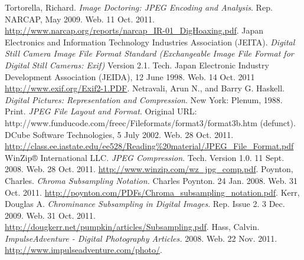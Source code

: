 \documentclass[oneside]{ecsgdp}         %
\begin{document}
\begin{thebibliography}{9}

	 Tortorella, Richard. \emph{Image Doctoring: JPEG Encoding and Analysis}. Rep. NARCAP, May 2009. Web. 11 Oct. 2011. \url{http://www.narcap.org/reports/narcap_IR-01_DigHoaxing.pdf}.
	 Japan Electronics and Information Technology Industries Association (JEITA). \emph{Digital Still Camera Image File Format Standard (Exchangeable Image File Format for Digital Still Cameras: Exif)} Version 2.1. Tech. Japan Electronic Industry Development Association (JEIDA), 12 June 1998. Web. 14 Oct. 2011 \url{http://www.exif.org/Exif2-1.PDF}.
	 Netravali, Arun N., and Barry G. Haskell. \emph{Digital Pictures: Representation and Compression}. New York: Plenum, 1988. Print. 
	 \emph{JPEG File Layout and Format}. Original URL: \\http://www.funducode.com/freec/Fileformats/format3/format3b.htm (defunct).\\DCube Software Technologies, 5 July 2002. Web. 28 Oct. 2011. \url{http://class.ee.iastate.edu/ee528/Reading%20material/JPEG_File_Format.pdf}
	 WinZip® International LLC. \emph{JPEG Compression}. Tech. Version 1.0. 11 Sept. 2008. Web. 28 Oct. 2011. \url{http://www.winzip.com/wz_jpg_comp.pdf}.
	 Poynton, Charles. \emph{Chroma Subsampling Notation.} Charles Poynton. 24 Jan. 2008. Web. 31 Oct. 2011. \url{http://poynton.com/PDFs/Chroma_subsampling_notation.pdf}.
	 Kerr, Douglas A. \emph{Chrominance Subsampling in Digital Images}. Rep. Issue 2. 3 Dec. 2009. Web. 31 Oct. 2011. \url{http://dougkerr.net/pumpkin/articles/Subsampling.pdf}.
	 Hass, Calvin. \emph{ImpulseAdventure - Digital Photography Articles.} 2008. Web. 22 Nov. 2011. \url{http://www.impulseadventure.com/photo/}.

\end{thebibliography}
\end{document}
